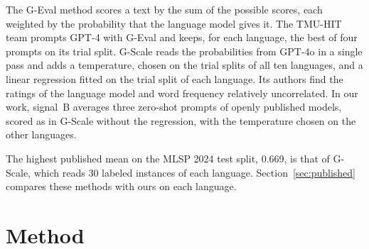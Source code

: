 \documentclass[11pt]{article}
\begin{document}
The G-Eval method \citep{liu-etal-2023-geval} scores a text by the sum of the possible scores, each weighted by the probability that the %
language model gives it. The TMU-HIT team \citep{enomoto-etal-2024-tmu} prompts GPT-4 with G-Eval %
and keeps, for each language, the best of four prompts on its trial split. %
G-Scale \citep{nohejl-etal-2025-japanese} reads the probabilities from GPT-4o in a single pass and %
adds a temperature, chosen on the trial splits of all ten languages, and a linear regression %
fitted on the trial split of each language. Its authors find %
the ratings of the language model and word frequency relatively uncorrelated. In our work,
signal~B averages three zero-shot prompts of openly published models, scored as in G-Scale %
without the regression, with the temperature chosen on the other languages.

The highest published mean on the MLSP 2024 test split, 0.669, is that of G-Scale, which reads %
30 labeled instances of each language. Section~\ref{sec:published} compares these methods with
ours on each language.


\section{Method}
\label{sec:method}
\end{document}
